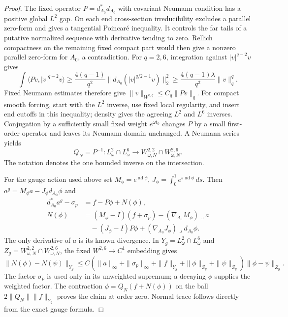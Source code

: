 \documentclass[11pt]{amsart}
\theoremstyle{definition}
\theoremstyle{remark}
\theoremstyle{plain}
\newcommand{\ad}{\operatorname{ad}}
\begin{document}
\begin{proof}
The fixed operator $P=d_{A_0}^*d_{A_0}$ with covariant Neumann
condition has a positive global $L^2$ gap. On each end cross-section
irreducibility excludes a parallel zero-form and gives a tangential
Poincaré inequality. It controls the far tails of a putative
normalized sequence with derivative tending to zero. Rellich
compactness on the remaining fixed compact part would then give
a nonzero parallel zero-form for $A_0$, a contradiction.
For $q=2,6$, integration against $|v|^{q-2}v$ gives
\[
 \int\langle Pv,|v|^{q-2}v\rangle
 \geq \frac{4(q-1)}{q^2}\|d_{A_0}(|v|^{q/2-1}v)\|_2^2
 \geq \frac{4(q-1)\lambda}{q^2}\|v\|_q^q.
\]
Fixed Neumann estimates therefore give
$\|v\|_{W^{2,q}}\leq C_q\|Pv\|_q$.
For compact smooth forcing, start with the $L^2$ inverse,
use fixed local regularity, and insert end cutoffs in this
inequality; density gives the agreeing $L^2$ and $L^6$
inverses. Conjugation by a sufficiently small fixed weight
$e^{\omega t_0}$ changes $P$ by a small first-order operator
and leaves its Neumann domain unchanged. A Neumann series yields
\[
 Q_N=P^{-1}:L_\omega^2\cap L_\omega^6
                  \longrightarrow W_{\omega,N}^{2,2}\cap
                                         W_{\omega,N}^{2,6}.
\]
The notation denotes the one bounded inverse on the intersection.

For the gauge action used above set
$M_\phi=e^{\ad\phi}$, $J_\phi=\int_0^1e^{s\ad\phi}\,ds$.
Then $a^g=M_\phi a-J_\phi d_{A_0}\phi$ and
\begin{equation}\label{eq:converse-gauge-remainder}
\begin{split}
 d_{A_0}^*a^g-\sigma_p&=f-P\phi+N(\phi),\\
 N(\phi)&=(M_\phi-I)(f+\sigma_p)
       -(\nabla_{A_0}M_\phi)\mathbin{\lrcorner}a\\
 &\quad -(J_\phi-I)P\phi
       +(\nabla_{A_0}J_\phi)\mathbin{\lrcorner}d_{A_0}\phi .
\end{split}
\end{equation}
The only derivative of $a$ is its known divergence. In
$Y_g=L_\omega^2\cap L_\omega^6$ and
$Z_g=W_{\omega,N}^{2,2}\cap W_{\omega,N}^{2,6}$, the fixed
$W^{2,6}\to C^1$ embedding gives
\[
 \|N(\phi)-N(\psi)\|_{Y_g}
 \leq C(\|a\|_\infty+\|\sigma_p\|_\infty+\|f\|_{Y_g}
                    +\|\phi\|_{Z_g}+\|\psi\|_{Z_g})
                                    \|\phi-\psi\|_{Z_g}.
\]
The factor $\sigma_p$ is used only in its unweighted supremum;
a decaying $\phi$ supplies the weighted factor. The contraction
$\phi=Q_N(f+N(\phi))$ on the ball $2\|Q_N\|\|f\|_{Y_g}$
proves the claim at order zero. Normal trace follows directly
from the exact gauge formula.


\end{proof}
\end{document}
